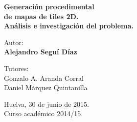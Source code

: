 {\begin{center}
{\LARGE \bf Generación procedimental \\de mapas de tiles 2D. \\ Análisis e investigación del problema. }

\end{center} 




\vspace*{0.5cm}

\begin{center}
{\normalsize Autor: \\ {\bf Alejandro Seguí Díaz}}
\end{center}

\begin{center}
{\small Tutores: }
\vspace*{0.2cm}
{\small \\  Gonzalo A. Aranda Corral \\ Daniel Márquez Quintanilla}
\end{center}

\vspace*{0.5cm}
\vfill
\begin{center}
{\footnotesize Huelva, 30 de junio de 2015.\\Curso académico 2014/15.}
\end{center}





\newpage
\thispagestyle{empty}
\mbox{ }
\newpage
\thispagestyle{empty}

\newpage
\thispagestyle{empty}

\mbox{ }

\vfill

\begin{flushright}
  \begin{minipage}{9cm}

\end{minipage}
\end{flushright}

\vfill

\newpage
\thispagestyle{empty}
\mbox{ }

}

